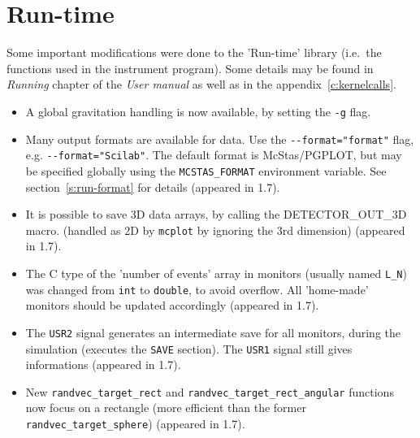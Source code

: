 
\section{Run-time} 
\label{s:new-features:run-time}

Some important modifications were done to the 'Run-time' library 
(i.e.\ the functions used in the instrument program). 
Some details may be found in {\it Running} chapter of the {\it User manual}
as well as in the appendix~\ref{c:kernelcalls}.

\begin{itemize}
\item A global gravitation handling is now available, by setting the \verb+-g+ flag.
\item Many output formats are available for data. Use the
    \verb+--format="format"+ flag, e.g. \verb+--format="Scilab"+.  The default
    format is McStas/PGPLOT, but may be specified globally using the
    \verb+MCSTAS_FORMAT+ environment variable.  See section~\ref{s:run-format}
    for details (appeared in 1.7). 
\item It is possible to save 3D data arrays, by calling the DETECTOR\_OUT\_3D
    macro. (handled as 2D by \verb+mcplot+ by ignoring the 3rd dimension)
    (appeared in 1.7).  
\item The C type of the 'number of events' array in monitors (usually named
    \verb+L_N+) was changed from \verb+int+ to \verb+double+, to avoid overflow.
    All 'home-made' monitors should be updated accordingly (appeared in 1.7).
\item The \verb+USR2+ signal generates an intermediate save for all monitors,
    during the simulation (executes the \texttt{SAVE} section). The \verb+USR1+
    signal still gives informations (appeared in 1.7). 
\item New \verb+randvec_target_rect+ and \verb+randvec_target_rect_angular+
    functions now focus  on a rectangle (more efficient than the former
    \verb+randvec_target_sphere+) (appeared in 1.7).
\end{itemize}


